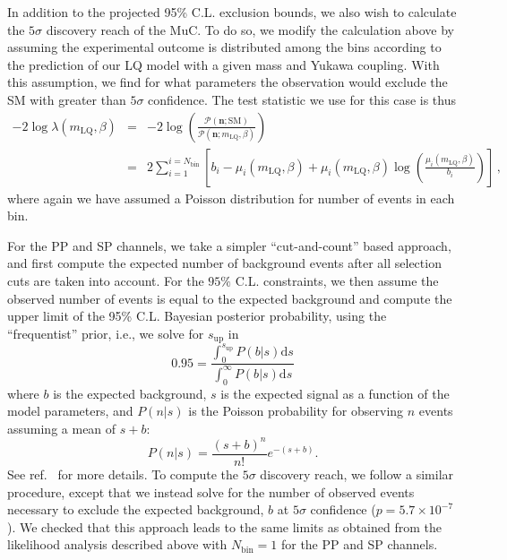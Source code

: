 \documentclass[a4paper,11pt]{article}
\def\dd{\text{d}}
\newcommand{\muc}{MuC}
\begin{document}
In addition to the projected 95\% C.L. exclusion bounds, we also wish to calculate the $5\sigma$ discovery reach of the \muc.
To do so, we modify the calculation above by assuming the experimental outcome is distributed among the bins according to the prediction of our LQ model with a given mass and Yukawa coupling. 
With this assumption, we find for what parameters the observation would exclude the SM with greater than $5\sigma$ confidence. 
The test statistic we use for this case is thus
\begin{eqnarray}
    -2 \log  \lambda(m_{\mathrm{LQ}},\beta) &=& -2 \log \left( \frac{\mathcal{P}(\mathbf{n};\mathrm{SM})}{\mathcal{P}(\mathbf{n};m_{\mathrm{LQ}},\beta)}\right) \nonumber \\ 
    &=& 2 \sum_{i=1}^{i=N_{\mathrm{bin}}} \left[    b_i- \mu_i (m_{\mathrm{LQ}},\beta) + \mu_i (m_{\mathrm{LQ}},\beta) \log \left( \frac{\mu_i (m_{\mathrm{LQ}},\beta)}{b_i}  \right)            \right] \, ,
    \label{eq:lambda_def2}
\end{eqnarray}
where again we have assumed a Poisson distribution for number of events in each bin.

For the PP and SP channels, we take a simpler ``cut-and-count'' based approach, and first compute the expected number of background events after all selection cuts are taken into account.
For the $95\%$ C.L. constraints, we then assume the observed number of events is equal to the expected background and compute the upper limit of the 95\% C.L. Bayesian posterior probability, using the ``frequentist'' prior, i.e., we solve for $s_{\textrm{up}}$ in
\begin{equation}
0.95 = \frac{\int_{0}^{s_{\textrm{up}}} P(b | s) \dd s}{\int_0^{\infty} P(b | s) \dd s}
\end{equation}
where $b$ is the expected background, $s$ is the expected signal as a function of the model parameters, and $P(n | s)$ is the Poisson probability for observing $n$ events assuming a mean of $s + b$:
\begin{equation}
    P(n | s) = \frac{(s+b)^n}{n!} e^{-(s+b)} .
\end{equation}
See ref.~\cite{Cowan:1998ji, Cowan:2010js} for more details.
To compute the $5\sigma$ discovery reach, we follow a similar procedure, except that we instead solve for the number of observed events necessary to exclude the expected background, $b$ at $5\sigma$ confidence ($p = 5.7\times 10^{-7}$).
We checked that this approach leads to the same limits as obtained from the likelihood analysis described above with $N_{\textrm{bin}} = 1$ for the PP and SP channels.
\end{document}
